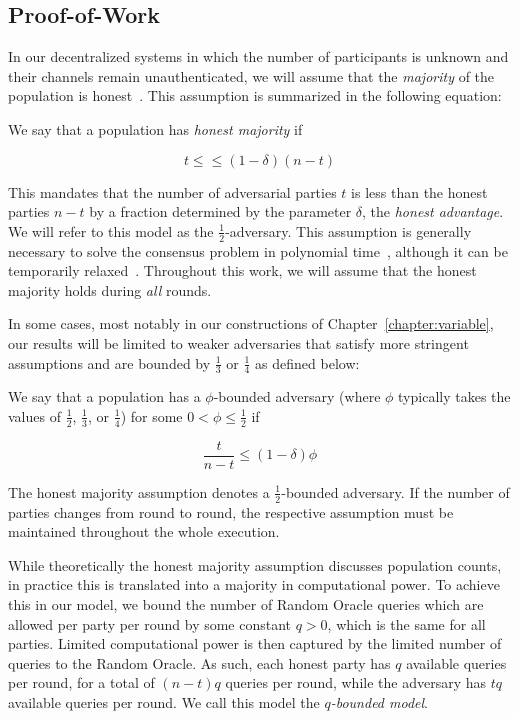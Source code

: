 \subsection{Proof-of-Work}
In our decentralized systems in which the number of participants is unknown and
their channels remain unauthenticated, we will assume that the \emph{majority}
of the population is honest~\cite{backbone}. This assumption is summarized in
the following equation:

\begin{definition}\index{$\delta$}
  We say that a population has \emph{honest majority} if

  \[
  t \leq \leq (1 - \delta)(n - t)
  \]
\end{definition}

This mandates that the number of adversarial parties $t$ is less than the honest
parties $n - t$ by a fraction determined by the parameter $\delta$, the
\emph{honest advantage}. We will refer to
this model as the $\frac{1}{2}$-adversary. This assumption is generally
necessary to solve the consensus problem in polynomial time~\cite{okun},
although it can be temporarily relaxed~\cite{dishonest}. Throughout this
work, we will assume that the honest majority holds during \emph{all} rounds.

In some cases, most notably in our constructions of
Chapter~\ref{chapter:variable}, our results will be limited to weaker
adversaries that satisfy more stringent assumptions and are bounded by
$\frac{1}{3}$ or $\frac{1}{4}$ as defined below:

\begin{definition}
  We say that a population has a $\phi$-bounded adversary (where $\phi$
  typically takes the values of $\frac{1}{2}$, $\frac{1}{3}$, or $\frac{1}{4}$)
  for some $0 < \phi \leq \frac{1}{2}$ if

  \[
  \frac{t}{n - t} \leq (1 - \delta)\phi
  \]
\end{definition}

The honest majority assumption denotes a $\frac{1}{2}$-bounded adversary. If the
number of parties changes from round to round, the respective assumption must be
maintained throughout the whole execution.

While theoretically the honest majority assumption discusses population counts,
in practice this is translated into a majority in computational power. To
achieve this in our model, we bound the number of Random Oracle queries which
are allowed per party per round by some constant $q > 0$, which is the same for all
parties. Limited computational power is then captured by the limited number of
queries to the Random Oracle. As such, each honest party has $q$ available
queries per round, for a total of $(n - t)q$ queries per round, while the
adversary has $tq$ available queries per round. We call this model the
\emph{$q$-bounded model}.

